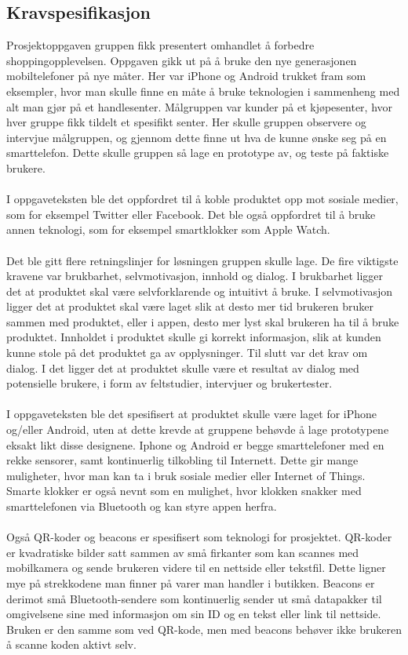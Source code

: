 \subsection{Kravspesifikasjon}
Prosjektoppgaven gruppen fikk presentert omhandlet å forbedre shoppingopplevelsen. Oppgaven gikk ut på å bruke den nye generasjonen mobiltelefoner på nye måter. Her var iPhone og Android trukket fram som eksempler, hvor man skulle finne en måte å bruke teknologien i sammenheng med alt man gjør på et handlesenter. Målgruppen var kunder på et kjøpesenter, hvor hver gruppe fikk tildelt et spesifikt senter. Her skulle gruppen observere og intervjue målgruppen, og gjennom dette finne ut hva de kunne ønske seg på en smarttelefon. Dette skulle gruppen så lage en prototype av, og teste på faktiske brukere.
\\\\
I oppgaveteksten ble det oppfordret til å koble produktet opp mot sosiale medier, som for eksempel Twitter eller Facebook. Det ble også oppfordret til å bruke annen teknologi, som for eksempel smartklokker som Apple Watch. 
\\\\
Det ble gitt flere retningslinjer for løsningen gruppen skulle lage. De fire viktigste kravene var brukbarhet, selvmotivasjon, innhold og dialog. I brukbarhet ligger det at produktet skal være selvforklarende og intuitivt å bruke. I selvmotivasjon ligger det at produktet skal være laget slik at desto mer tid brukeren bruker sammen med produktet, eller i appen, desto mer lyst skal brukeren ha til å bruke produktet. Innholdet i produktet skulle gi korrekt informasjon, slik at kunden kunne stole på det produktet ga av opplysninger. Til slutt var det krav om dialog. I det ligger det at produktet skulle være et resultat av dialog med potensielle brukere, i form av feltstudier, intervjuer og brukertester.
\\\\
I oppgaveteksten ble det spesifisert at produktet skulle være laget for iPhone og/eller Android, uten at dette krevde at gruppene behøvde å lage prototypene eksakt likt disse designene. Iphone og Android er begge smarttelefoner med en rekke sensorer, samt kontinuerlig tilkobling til Internett. Dette gir mange muligheter, hvor man kan ta i bruk sosiale medier eller Internet of Things. Smarte klokker er også nevnt som en mulighet, hvor klokken snakker med smarttelefonen via Bluetooth og kan styre appen herfra. 
\\\\
Også QR-koder og beacons er spesifisert som teknologi for prosjektet. QR-koder er kvadratiske bilder satt sammen av små firkanter som kan scannes med mobilkamera og sende brukeren videre til en nettside eller tekstfil. Dette ligner mye på strekkodene man finner på varer man handler i butikken. Beacons er derimot små Bluetooth-sendere som kontinuerlig sender ut små datapakker til omgivelsene sine med informasjon om sin ID og en tekst eller link til nettside. Bruken er den samme som ved QR-kode, men med beacons behøver ikke brukeren å scanne koden aktivt selv.
